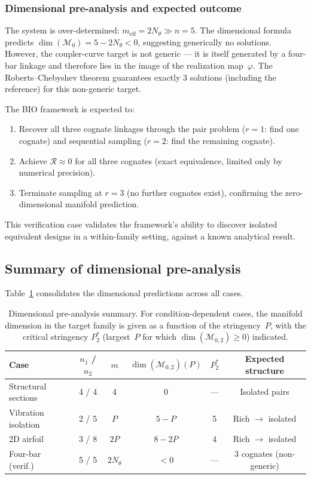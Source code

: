 \subsubsection{Dimensional pre-analysis and expected outcome}

The system is over-determined: $m_{\mathrm{eff}} = 2 N_\theta \gg n = 5$. The dimensional formula predicts $\dim(\mathcal{M}_0) = 5 - 2N_\theta < 0$, suggesting generically no solutions. However, the coupler-curve target is not generic --- it is itself generated by a four-bar linkage and therefore lies in the image of the realization map~$\varphi$. The Roberts--Chebyshev theorem guarantees exactly 3 solutions (including the reference) for this non-generic target.

The BIO framework is expected to:
\begin{enumerate}
    \item Recover all three cognate linkages through the pair problem ($r = 1$: find one cognate) and sequential sampling ($r = 2$: find the remaining cognate).
    \item Achieve $\mathcal{R} \approx 0$ for all three cognates (exact equivalence, limited only by numerical precision).
    \item Terminate sampling at $r = 3$ (no further cognates exist), confirming the zero-dimensional manifold prediction.
\end{enumerate}

This verification case validates the framework's ability to discover isolated equivalent designs in a within-family setting, against a known analytical result.


\subsection{Summary of dimensional pre-analysis}
\label{sec:dim_summary}

Table~\ref{tab:dim_summary} consolidates the dimensional predictions across all cases.

\begin{table}[t]
\centering
\caption{Dimensional pre-analysis summary. For condition-dependent cases, the manifold dimension in the target family is given as a function of the stringency~$P$, with the critical stringency $P^*_2$ (largest~$P$ for which $\dim(\mathcal{M}_{0,2}) \geq 0$) indicated.}
\label{tab:dim_summary}
\small
\begin{tabular}{lccccc}
\hline
Case & $n_1$ / $n_2$ & $m$ & $\dim(\mathcal{M}_{0,2})(P)$ & $P^*_2$ & Expected structure \\
\hline
Structural sections & 4 / 4 & 4 & 0 & --- & Isolated pairs \\
Vibration isolation & 2 / 5 & $P$ & $5 - P$ & 5 & Rich $\to$ isolated \\
2D airfoil & 3 / 8 & $2P$ & $8 - 2P$ & 4 & Rich $\to$ isolated \\
Four-bar (verif.) & 5 / 5 & $2N_\theta$ & $<0$ & --- & 3 cognates (non-generic) \\
\hline
\end{tabular}
\end{table}


